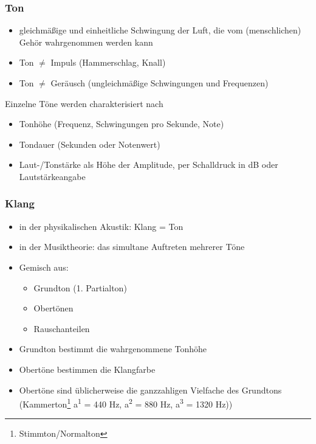 \documentclass[11pt,ngerman]{beamer}
\begin{document}
\begin{frame}
\frametitle{Ton}

\begin{itemize}
	\item gleichmäßige und einheitliche Schwingung der Luft, die vom (menschlichen) Gehör wahrgenommen werden kann
	\item Ton $\not=$ Impuls (Hammerschlag, Knall)
	\item Ton $\not=$ Geräusch (ungleichmäßige Schwingungen und Frequenzen)
\end{itemize}\vspace*{1em}

Einzelne Töne werden charakterisiert nach \vspace*{0.5em}

\begin{itemize}
	\item Tonhöhe (Frequenz, Schwingungen pro Sekunde, Note)
	\item Tondauer (Sekunden oder Notenwert)
	\item Laut-/Tonstärke als Höhe der Amplitude, per Schalldruck in dB oder Lautstärkeangabe
\end{itemize}

\end{frame}


\begin{frame}
\frametitle{Klang}

\begin{itemize}
\item in der physikalischen Akustik: Klang = Ton
\item in der Musiktheorie: das simultane Auftreten mehrerer Töne
\item Gemisch aus:

\begin{itemize}
	\item Grundton (1. Partialton)
	\item Obertönen
	\item Rauschanteilen
	\end{itemize}

\item Grundton bestimmt die wahrgenommene Tonhöhe
\item Obertöne bestimmen die Klangfarbe
\item Obertöne sind üblicherweise die ganzzahligen Vielfache des Grundtons (Kammerton\footnote{Stimmton/Normalton} a\textsuperscript{1} = 440 Hz, a\textsuperscript{2} = 880 Hz, \newline a\textsuperscript{3} = 1320 Hz))
\end{itemize}
\end{frame}
\end{document}
